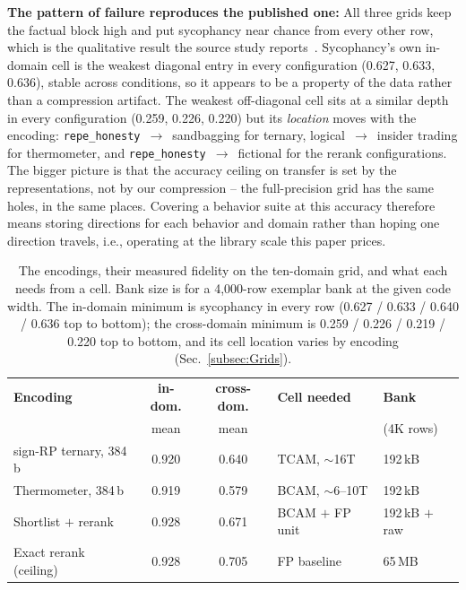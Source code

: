 \documentclass[conference]{IEEEtran}
\newcommand{\tcam}{{TCAM}\xspace}
\newcommand{\signrp}{{sign-RP}\xspace}
\begin{document}
\textbf{The pattern of failure reproduces the published one:} All three
grids keep the factual block high and put sycophancy near chance from
every other row, which is the qualitative result the source study
reports~\cite{ying2026spectrum}. Sycophancy's own in-domain cell is the
weakest diagonal entry in every configuration (0.627, 0.633, 0.636),
stable across conditions, so it appears to be a property of the data
rather than a compression artifact. The weakest off-diagonal cell sits
at a similar depth in every configuration (0.259, 0.226, 0.220) but
its \emph{location} moves with the encoding:
\texttt{repe\_honesty}~$\to$~sandbagging for ternary,
logical~$\to$~insider trading for thermometer, and
\texttt{repe\_honesty}~$\to$~fictional for the rerank
configurations. The bigger picture is that the accuracy ceiling on
transfer is set by the representations, not by our compression -- the
full-precision grid has the same holes, in the same places. Covering
a behavior suite at this accuracy therefore means storing directions
for each behavior and domain rather than hoping one direction
travels, i.e., operating at the library scale this paper
prices.

\begin{table}[t]
\centering
\caption{The encodings, their measured fidelity on the ten-domain grid,
and what each needs from a cell. Bank size is for a 4{,}000-row exemplar
bank at the given code width. The in-domain minimum is sycophancy in
every row (0.627 / 0.633 / 0.640 / 0.636 top to bottom); the
cross-domain minimum is 0.259 / 0.226 / 0.219 / 0.220 top to bottom,
and its cell location varies by encoding
(Sec.~\ref{subsec:Grids}).}
\label{tab:encodings}
{\scriptsize\setlength{\tabcolsep}{3.5pt}
\begin{tabular}{@{}lccll@{}}
\toprule
\textbf{Encoding} & \textbf{in-dom.} & \textbf{cross-dom.} &
\textbf{Cell needed} & \textbf{Bank} \\
 & mean & mean & & (4K rows) \\
\midrule
\signrp ternary, 384\,b       & 0.920 & 0.640 & \tcam, $\sim$16T   & 192\,kB \\
Thermometer, 384\,b           & 0.919 & 0.579 & BCAM, $\sim$6--10T & 192\,kB \\
Shortlist $+$ rerank          & 0.928 & 0.671 & BCAM $+$ FP unit   & 192\,kB $+$ raw \\
Exact rerank (ceiling)        & 0.928 & 0.705 & FP baseline        & 65\,MB \\
\bottomrule
\end{tabular}}
\end{table}
\end{document}
